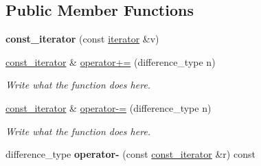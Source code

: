 \subsection*{Public Member Functions}
\begin{DoxyCompactItemize}
\item 
\hypertarget{classcircularDeque_1_1const__iterator_a53e008033bdfbae4dd83c5e9de26652b}{{\bfseries const\+\_\+iterator} (const \hyperlink{classcircularDeque_1_1iterator}{iterator} \&v)}\label{classcircularDeque_1_1const__iterator_a53e008033bdfbae4dd83c5e9de26652b}

\item 
\hyperlink{classcircularDeque_1_1const__iterator}{const\+\_\+iterator} \& \hyperlink{classcircularDeque_1_1const__iterator_aaa9b3f1937d17f6f12f9986c477f89f5}{operator+=} (difference\+\_\+type n)
\begin{DoxyCompactList}\small\item\em Write what the function does here. \end{DoxyCompactList}\item 
\hyperlink{classcircularDeque_1_1const__iterator}{const\+\_\+iterator} \& \hyperlink{classcircularDeque_1_1const__iterator_a4e4380fcc95e65534c39c83b93f708f8}{operator-\/=} (difference\+\_\+type n)
\begin{DoxyCompactList}\small\item\em Write what the function does here. \end{DoxyCompactList}\item 
\hypertarget{classcircularDeque_1_1const__iterator_a3b2d9d2083342f3b378e87ea8fb271f3}{difference\+\_\+type {\bfseries operator-\/} (const \hyperlink{classcircularDeque_1_1const__iterator}{const\+\_\+iterator} \&r) const }\label{classcircularDeque_1_1const__iterator_a3b2d9d2083342f3b378e87ea8fb271f3}


\end{DoxyCompactItemize}
